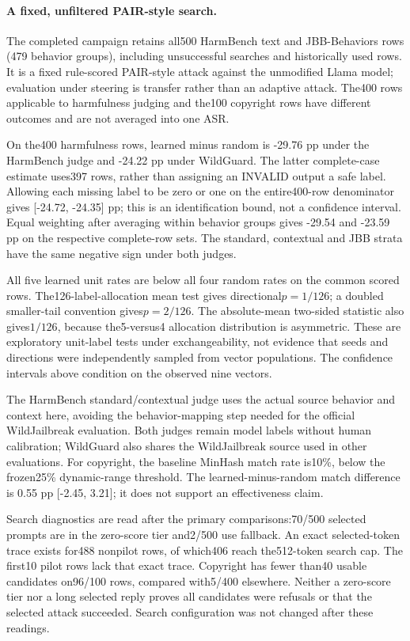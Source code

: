 \paragraph{A fixed, unfiltered PAIR-style search.}
The completed campaign retains all500 HarmBench text and JBB-Behaviors rows (479 behavior groups), including unsuccessful searches and historically used rows. It is a fixed rule-scored PAIR-style attack against the unmodified Llama model; evaluation under steering is transfer rather than an adaptive attack. The400 rows applicable to harmfulness judging and the100 copyright rows have different outcomes and are not averaged into one ASR.

On the400 harmfulness rows, learned minus random is -29.76 pp under the HarmBench judge and -24.22 pp under WildGuard. The latter complete-case estimate uses397 rows, rather than assigning an INVALID output a safe label. Allowing each missing label to be zero or one on the entire400-row denominator gives [-24.72, -24.35] pp; this is an identification bound, not a confidence interval. Equal weighting after averaging within behavior groups gives -29.54 and -23.59 pp on the respective complete-row sets. The standard, contextual and JBB strata have the same negative sign under both judges.

All five learned unit rates are below all four random rates on the common scored rows. The126-label-allocation mean test gives directional$p=1/126$; a doubled smaller-tail convention gives$p=2/126$. The absolute-mean two-sided statistic also gives$1/126$, because the5-versus4 allocation distribution is asymmetric. These are exploratory unit-label tests under exchangeability, not evidence that seeds and directions were independently sampled from vector populations. The confidence intervals above condition on the observed nine vectors.

The HarmBench standard/contextual judge uses the actual source behavior and context here, avoiding the behavior-mapping step needed for the official WildJailbreak evaluation. Both judges remain model labels without human calibration; WildGuard also shares the WildJailbreak source used in other evaluations. For copyright, the baseline MinHash match rate is10\%, below the frozen25\% dynamic-range threshold. The learned-minus-random match difference is 0.55 pp [-2.45, 3.21]; it does not support an effectiveness claim.

Search diagnostics are read after the primary comparisons:70/500 selected prompts are in the zero-score tier and2/500 use fallback. An exact selected-token trace exists for488 nonpilot rows, of which406 reach the512-token search cap. The first10 pilot rows lack that exact trace. Copyright has fewer than40 usable candidates on96/100 rows, compared with5/400 elsewhere. Neither a zero-score tier nor a long selected reply proves all candidates were refusals or that the selected attack succeeded. Search configuration was not changed after these readings.

